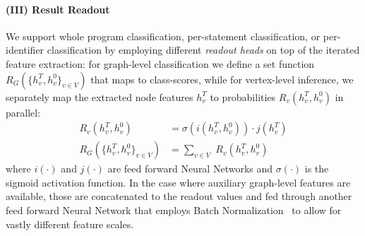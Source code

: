 \paragraph{(III) Result Readout} We support whole program
classification, per-statement classification, or per-identifier
classification by employing different \emph{readout heads} on top of
the iterated feature extraction: for graph-level classification we
define a set function $R_G(\{h_v^T, h_v^0\}_{v \in V})$ that maps to
class-scores, while for vertex-level inference, we separately map the
extracted node features $h_v^T$ to probabilities $R_v(h_v^T, h_v^0)$
in parallel:
\begin{align}
  R_{v}(h_v^T, h_v^0) &= \sigma\left(i(h_v^T, h_v^0)\right) \cdot j(h_v^T) \\
  R_{G}(\{h_v^T, h_v^0\}_{v \in V}) &= \sum\limits_{v \in V}\,\,R_{v}(h_v^T, h_v^0)
\end{align}
where $i(\cdot)$ and $j(\cdot)$ are feed forward Neural Networks and
$\sigma(\cdot)$ is the sigmoid activation function.  In the case where
auxiliary graph-level features are available, those are concatenated
to the readout values and fed through another feed forward Neural
Network that employs Batch Normalization~\cite{Ioffe2015a} to allow
for vastly different feature scales.
